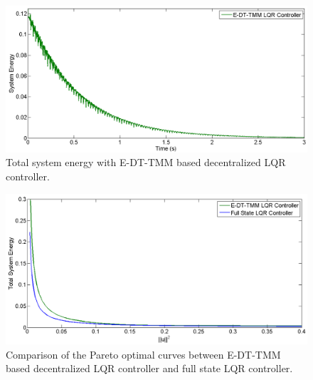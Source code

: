 \documentclass[11pt]{ucthesis}
\begin{document}
\begin{figure}[h]
\centering
\includegraphics[width=1\linewidth]{Figures/Mass9Controller_1.png}
\caption{Total system energy with E-DT-TMM based decentralized LQR controller.}
\label{fig:DTTMM9}
\end{figure}
\begin{figure}[h]
\centering
\includegraphics[width=1\linewidth]{Figures/ParetoEnergy9.png}
\caption{Comparison of the Pareto optimal curves between E-DT-TMM based decentralized LQR controller and full state LQR controller.}
\label{fig:Pareto9}
\end{figure}
\end{document}
